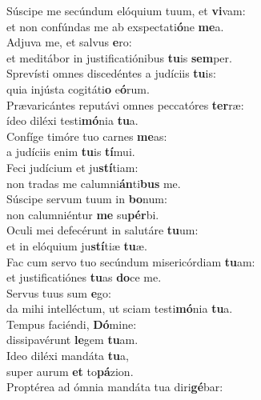 \evenverse Súscipe me secúndum elóquium tuum, et \textbf{vi}vam:~\*\\
\evenverse et non confúndas me ab exspectati\textbf{ó}ne \textbf{me}a.\\
\oddverse Adjuva me, et salvus \textbf{e}ro:~\*\\
\oddverse et meditábor in justificatiónibus \textbf{tu}is \textbf{sem}per.\\
\evenverse Sprevísti omnes discedéntes a judíciis \textbf{tu}is:~\*\\
\evenverse quia injústa cogitáti\textbf{o} e\textbf{ó}rum.\\
\oddverse Prævaricántes reputávi omnes peccatóres \textbf{ter}ræ:~\*\\
\oddverse ídeo diléxi testi\textbf{mó}nia \textbf{tu}a.\\
\evenverse Confíge timóre tuo carnes \textbf{me}as:~\*\\
\evenverse a judíciis enim \textbf{tu}is \textbf{tí}mui.\\
\oddverse Feci judícium et ju\textbf{stí}tiam:~\*\\
\oddverse non tradas me calumni\textbf{án}ti\textbf{bus} me.\\
\evenverse Súscipe servum tuum in \textbf{bo}num:~\*\\
\evenverse non calumniéntur \textbf{me} su\textbf{pér}bi.\\
\oddverse Oculi mei defecérunt in salutáre \textbf{tu}um:~\*\\
\oddverse et in elóquium ju\textbf{stí}tiæ \textbf{tu}æ.\\
\evenverse Fac cum servo tuo secúndum misericórdiam \textbf{tu}am:~\*\\
\evenverse et justificatiónes \textbf{tu}as \textbf{do}ce me.\\
\oddverse Servus tuus sum \textbf{e}go:~\*\\
\oddverse da mihi intelléctum, ut sciam testi\textbf{mó}nia \textbf{tu}a.\\
\evenverse Tempus faciéndi, \textbf{Dó}mine:~\*\\
\evenverse dissipavérunt \textbf{le}gem \textbf{tu}am.\\
\oddverse Ideo diléxi mandáta \textbf{tu}a,~\*\\
\oddverse super aurum \textbf{et} to\textbf{pá}zion.\\
\evenverse Proptérea ad ómnia mandáta tua diri\textbf{gé}bar:~\*\\
